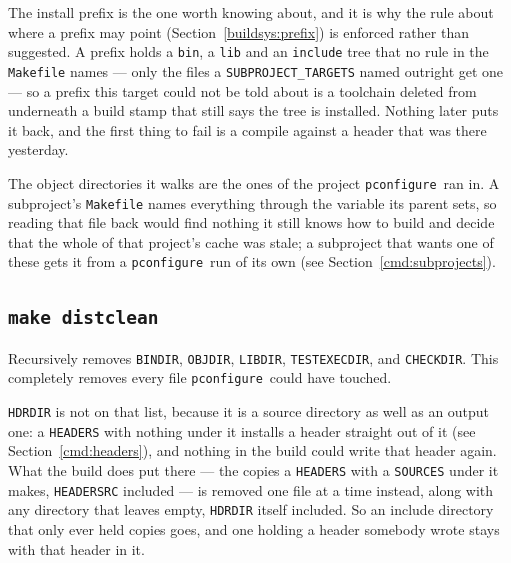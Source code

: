 \documentclass{article}
\newcommand{\pconfigure}{\texttt{pconfigure}}
\begin{document}
The install prefix is the one worth knowing about, and it is why the
rule about where a prefix may point (Section~\ref{buildsys:prefix}) is
enforced rather than suggested.  A prefix holds a \texttt{bin}, a
\texttt{lib} and an \texttt{include} tree that no rule in the
\texttt{Makefile} names --- only the files a
\texttt{SUBPROJECT\_TARGETS} named outright get one --- so a prefix
this target could not be told about is a toolchain deleted from
underneath a build stamp that still says the tree is installed.
Nothing later puts it back, and the first thing to fail is a compile
against a header that was there yesterday.

The object directories it walks are the ones of the project
\pconfigure\ ran in.  A subproject's \texttt{Makefile} names
everything through the variable its parent sets, so reading that file
back would find nothing it still knows how to build and decide that
the whole of that project's cache was stale; a subproject that wants
one of these gets it from a \pconfigure\ run of its own (see
Section~\ref{cmd:subprojects}).

\subsection{\texttt{make distclean} \label{make:distclean}}

Recursively removes \texttt{BINDIR}, \texttt{OBJDIR}, \texttt{LIBDIR},
\texttt{TESTEXECDIR}, and \texttt{CHECKDIR}.  This completely removes every file
\pconfigure\ could have touched.

\texttt{HDRDIR} is not on that list, because it is a source directory
as well as an output one: a \texttt{HEADERS} with nothing under it
installs a header straight out of it (see Section~\ref{cmd:headers}),
and nothing in the build could write that header again.  What the
build does put there --- the copies a \texttt{HEADERS} with a
\texttt{SOURCES} under it makes, \texttt{HEADERSRC} included --- is
removed one file at a time instead, along with any directory that
leaves empty, \texttt{HDRDIR} itself included.  So an include
directory that only ever held copies goes, and one holding a header
somebody wrote stays with that header in it.
\end{document}
